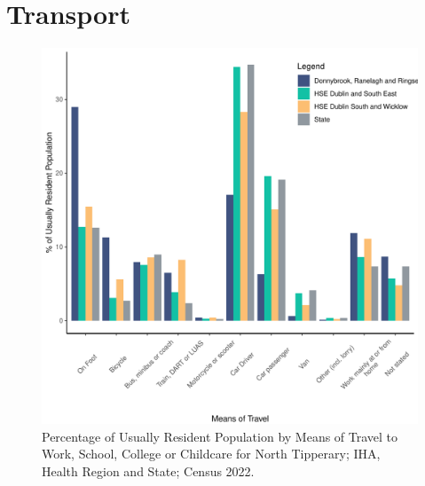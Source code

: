 \documentclass{article}
\begin{document}
\section{Transport}\label{sect:Trans}
\begin{figure}[H]
	\centering
	\includegraphics[width = 120mm]{../figures/TravelED.pdf}
	\caption{Percentage of Usually Resident Population by Means of Travel to Work, School, College or Childcare for North Tipperary; IHA, Health Region and State; Census 2022.}
	\label{fig:vbnv}
	\end{figure}
\end{document}
